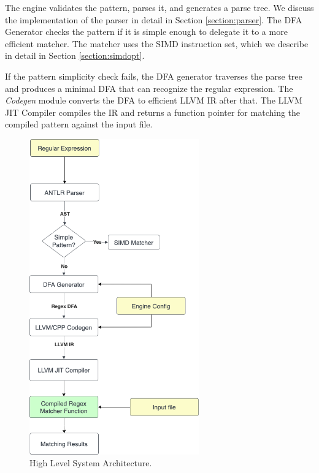 The engine validates the pattern, parses it, and generates a parse tree. We discuss the implementation of the parser in detail in Section \ref{section:parser}. The DFA Generator checks the pattern if it is simple enough to delegate it to a more efficient matcher. The matcher uses the SIMD instruction set, which we describe in detail in Section \ref{section:simdopt}.

If the pattern simplicity check fails, the DFA generator traverses the parse tree and produces a minimal DFA that can recognize the regular expression. The \textit{Codegen} module converts the DFA to efficient LLVM IR after that. The LLVM JIT Compiler compiles the IR and returns a function pointer for matching the compiled pattern against the input file.

\begin{figure}[htpb]
\centering
\includegraphics[width=0.65\textwidth]{imgs/sa-ext2.png}
\caption[System Architecture]{High Level System Architecture.}\label{fig:sa}
\end{figure}




